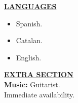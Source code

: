 \documentclass{article}
\begin{document}
	\noindent \textbf{\underline{LANGUAGES}} \\
	\begin{itemize}[noitemsep,nolistsep,leftmargin=*]
		\item {Spanish.}
		\item {Catalan.}
		\item {English. \\}
	\end{itemize}
	

	\noindent \textbf{\underline{EXTRA SECTION}} \\
	\noindent \textbf{Music:} Guitarist. \\
	\noindent Immediate availability.
	
	
\end{document}
